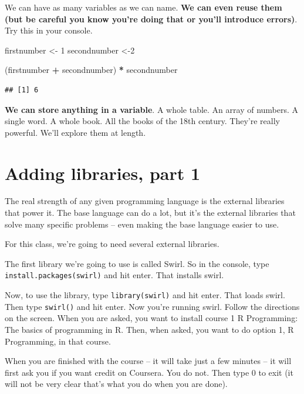 \documentclass[]{book}
\newenvironment{Shaded}{\begin{snugshade}}{\end{snugshade}}
\newcommand{\DecValTok}[1]{\textcolor[rgb]{0.00,0.00,0.81}{#1}}
\newcommand{\NormalTok}[1]{#1}
\newcommand{\OperatorTok}[1]{\textcolor[rgb]{0.81,0.36,0.00}{\textbf{#1}}}
\newcommand{\StringTok}[1]{\textcolor[rgb]{0.31,0.60,0.02}{#1}}
\begin{document}
We can have as many variables as we can name. \textbf{We can even reuse them (but be careful you know you're doing that or you'll introduce errors)}. Try this in your console.

\begin{Shaded}
\begin{Highlighting}[]
\NormalTok{firstnumber <-}\StringTok{ }\DecValTok{1}
\NormalTok{secondnumber <-}\DecValTok{2} 

\NormalTok{(firstnumber }\OperatorTok{+}\StringTok{ }\NormalTok{secondnumber) }\OperatorTok{*}\StringTok{ }\NormalTok{secondnumber}
\end{Highlighting}
\end{Shaded}

\begin{verbatim}
## [1] 6
\end{verbatim}

\textbf{We can store anything in a variable}. A whole table. An array of numbers. A single word. A whole book. All the books of the 18th century. They're really powerful. We'll explore them at length.

\hypertarget{adding-libraries-part-1}{%
\section{Adding libraries, part 1}\label{adding-libraries-part-1}}

The real strength of any given programming language is the external libraries that power it. The base language can do a lot, but it's the external libraries that solve many specific problems -- even making the base language easier to use.

For this class, we're going to need several external libraries.

The first library we're going to use is called Swirl. So in the console, type \texttt{install.packages(\textquotesingle{}swirl\textquotesingle{})} and hit enter. That installs swirl.

Now, to use the library, type \texttt{library(swirl)} and hit enter. That loads swirl. Then type \texttt{swirl()} and hit enter. Now you're running swirl. Follow the directions on the screen. When you are asked, you want to install course 1 R Programming: The basics of programming in R. Then, when asked, you want to do option 1, R Programming, in that course.

When you are finished with the course -- it will take just a few minutes -- it will first ask you if you want credit on Coursera. You do not. Then type 0 to exit (it will not be very clear that's what you do when you are done).
\end{document}
